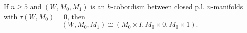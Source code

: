 If $n \geq 5$ and $(W, M_0, M_1)$ is an $h$-cobordism between closed p.l. $n$-manifolds with $\tau(W, M_0) = 0$, then
$$(W, M_0, M_1) \cong (M_0 \times I, M_0 \times 0, M_0 \times 1).$$
